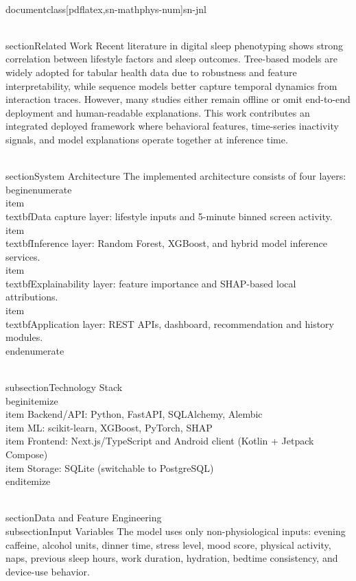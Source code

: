 \\documentclass[pdflatex,sn-mathphys-num]{sn-jnl}
\begin{document}
\\section{Related Work}
Recent literature in digital sleep phenotyping shows strong correlation between lifestyle factors and sleep outcomes. Tree-based models are widely adopted for tabular health data due to robustness and feature interpretability, while sequence models better capture temporal dynamics from interaction traces. However, many studies either remain offline or omit end-to-end deployment and human-readable explanations. This work contributes an integrated deployed framework where behavioral features, time-series inactivity signals, and model explanations operate together at inference time.

\\section{System Architecture}
The implemented architecture consists of four layers:
\\begin{enumerate}
    \\item \\textbf{Data capture layer}: lifestyle inputs and 5-minute binned screen activity.
    \\item \\textbf{Inference layer}: Random Forest, XGBoost, and hybrid model inference services.
    \\item \\textbf{Explainability layer}: feature importance and SHAP-based local attributions.
    \\item \\textbf{Application layer}: REST APIs, dashboard, recommendation and history modules.
\\end{enumerate}

\\subsection{Technology Stack}
\\begin{itemize}
    \\item Backend/API: Python, FastAPI, SQLAlchemy, Alembic
    \\item ML: scikit-learn, XGBoost, PyTorch, SHAP
    \\item Frontend: Next.js/TypeScript and Android client (Kotlin + Jetpack Compose)
    \\item Storage: SQLite (switchable to PostgreSQL)
\\end{itemize}

\\section{Data and Feature Engineering}
\\subsection{Input Variables}
The model uses only non-physiological inputs: evening caffeine, alcohol units, dinner time, stress level, mood score, physical activity, naps, previous sleep hours, work duration, hydration, bedtime consistency, and device-use behavior.
\end{document}
